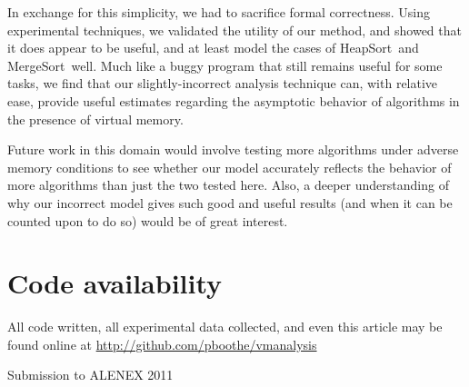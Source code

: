 \documentclass{acmtrans2m}
\newcommand{\heapsort}{{\sc HeapSort}}
\newcommand{\mergesort}{{\sc MergeSort}}
\begin{document}
In exchange for this simplicity, we had to sacrifice formal correctness.  Using
experimental techniques, we validated the utility of our method, and showed
that it does appear to be useful, and at least model the cases of \heapsort\
and \mergesort\ well.  Much like a buggy program that still remains useful for
some tasks, we find that our slightly-incorrect analysis technique can, with
relative ease, provide useful estimates regarding the asymptotic behavior of
algorithms in the presence of virtual memory.

Future work in this domain would involve testing more algorithms under adverse
memory conditions to see whether our model accurately reflects the behavior of
more algorithms than just the two tested here.  Also, a deeper understanding of
why our incorrect model gives such good and useful results (and when it can be
counted upon to do so) would be of great interest.




\appendix

\section{Code availability}

All code written, all experimental data collected, and even this article may be found online at \url{http://github.com/pboothe/vmanalysis}


\begin{received} 
Submission to ALENEX 2011
\end{received}
\end{document}
